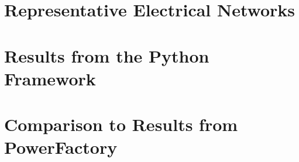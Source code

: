 

\chapter{Representative Electrical Networks}


\chapter{Results from the Python Framework}


\chapter{Comparison to Results from PowerFactory}